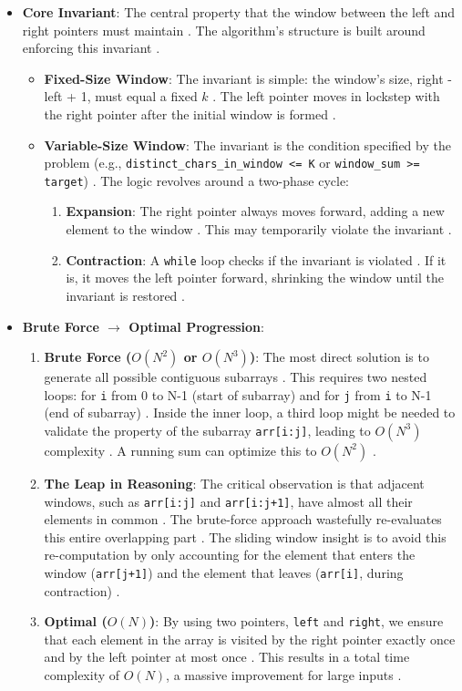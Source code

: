 \documentclass{article}
\begin{document}
\begin{itemize}
\begin{itemize}
\end{itemize}
\item \textbf{Core Invariant}: The central property that the window between the left and right pointers must maintain \cite{91}. The algorithm's structure is built around enforcing this invariant \cite{92}.
\begin{itemize}
\item \textbf{Fixed-Size Window}: The invariant is simple: the window's size, right - left + 1, must equal a fixed $k$ \cite{93, 96}. The left pointer moves in lockstep with the right pointer after the initial window is formed \cite{96}.
\item \textbf{Variable-Size Window}: The invariant is the condition specified by the problem (e.g., \texttt{distinct_chars_in_window <= K} or \texttt{window_sum >= target}) \cite{97}. The logic revolves around a two-phase cycle:
\begin{enumerate}
\item \textbf{Expansion}: The right pointer always moves forward, adding a new element to the window \cite{99}. This may temporarily violate the invariant \cite{100}.
\item \textbf{Contraction}: A \texttt{while} loop checks if the invariant is violated \cite{101}. If it is, it moves the left pointer forward, shrinking the window until the invariant is restored \cite{102}.
\end{enumerate}
\end{itemize}
\item \textbf{Brute Force $\rightarrow$ Optimal Progression}:
\begin{enumerate}
\item \textbf{Brute Force ($O(N^2)$ or $O(N^3)$)}: The most direct solution is to generate all possible contiguous subarrays \cite{104}. This requires two nested loops: for \texttt{i} from 0 to N-1 (start of subarray) and for \texttt{j} from \texttt{i} to N-1 (end of subarray) \cite{105}. Inside the inner loop, a third loop might be needed to validate the property of the subarray \texttt{arr[i:j]}, leading to $O(N^3)$ complexity \cite{106}. A running sum can optimize this to $O(N^2)$ \cite{107}.
\item \textbf{The Leap in Reasoning}: The critical observation is that adjacent windows, such as \texttt{arr[i:j]} and \texttt{arr[i:j+1]}, have almost all their elements in common \cite{108}. The brute-force approach wastefully re-evaluates this entire overlapping part \cite{109}. The sliding window insight is to avoid this re-computation by only accounting for the element that enters the window (\texttt{arr[j+1]}) and the element that leaves (\texttt{arr[i]}, during contraction) \cite{109}.
\item \textbf{Optimal ($O(N)$)}: By using two pointers, \texttt{left} and \texttt{right}, we ensure that each element in the array is visited by the right pointer exactly once and by the left pointer at most once \cite{110}. This results in a total time complexity of $O(N)$, a massive improvement for large inputs \cite{111}.
\end{enumerate}
\end{itemize}
\end{document}
